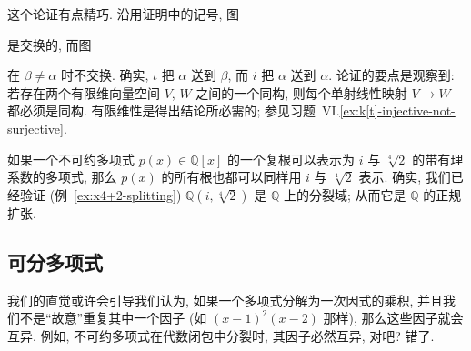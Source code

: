 \begin{remark}\label{rmk:normal-proof}
这个论证有点精巧. 沿用证明中的记号, 图
\begin{center}
\end{center}
是交换的, 而图
\begin{center}
\end{center}
在 $\beta\neq\alpha$ 时不交换. 确实, $\iota$ 把 $\alpha$ 送到 $\beta$, 而 $i$ 把 $\alpha$ 送到 $\alpha$. 论证的要点是观察到: 若存在两个有限维向量空间 $V$, $W$ 之间的一个同构, 则每个单射线性映射 $V\to W$ 都必须是同构. 有限维性是得出结论所必需的; 参见习题~VI.\ref{ex:k[t]-injective-not-surjective}.
\end{remark}

\begin{example}\label{ex:normal-Qi-root4}
如果一个不可约多项式 $p(x)\in\mathbb{Q}[x]$ 的一个复根可以表示为 $i$ 与 $\sqrt[4]{2}$ 的带有理系数的多项式, 那么 $p(x)$ 的所有根也都可以同样用 $i$ 与 $\sqrt[4]{2}$ 表示. 确实, 我们已经验证 (例~\ref{ex:x4+2-splitting}) $\mathbb{Q}(i,\sqrt[4]{2})$ 是 $\mathbb{Q}$ 上的分裂域; 从而它是 $\mathbb{Q}$ 的正规扩张.
\end{example}

\subsection{可分多项式}\label{subsec:separable-polynomials}

我们的直觉或许会引导我们认为, 如果一个多项式分解为一次因式的乘积, 并且我们不是``故意''重复其中一个因子 (如 $(x-1)^2(x-2)$ 那样), 那么这些因子就会互异. 例如, 不可约多项式在代数闭包中分裂时, 其因子必然互异, 对吧? 错了.

